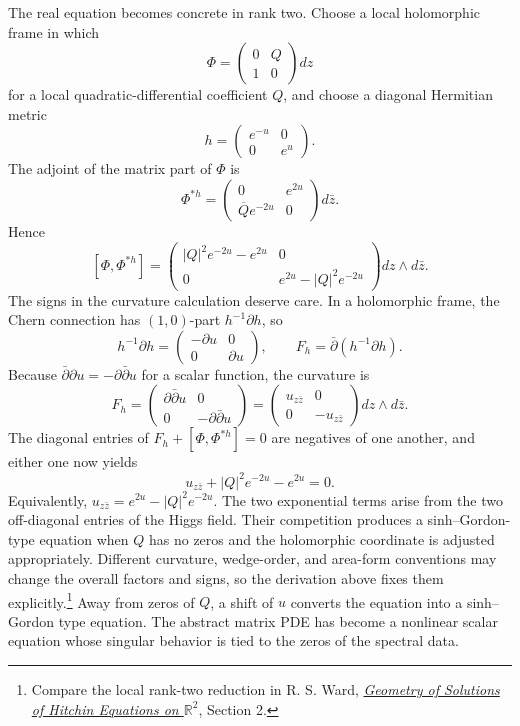 The real equation becomes concrete in rank two.  Choose a local holomorphic frame in which
\[
  \Phi=
  \begin{pmatrix}
    0&Q\\
    1&0
  \end{pmatrix}dz
\]
for a local quadratic-differential coefficient \(Q\), and choose a diagonal Hermitian metric
\[
  h=
  \begin{pmatrix}
    e^{-u}&0\\
    0&e^u
  \end{pmatrix}.
\]
The adjoint of the matrix part of \(\Phi\) is
\[
  \Phi^{*h}
  =
  \begin{pmatrix}
    0&e^{2u}\\
    \overline Q e^{-2u}&0
  \end{pmatrix}d\bar z.
\]
Hence
\[
  [\Phi,\Phi^{*h}]
  =
  \begin{pmatrix}
    |Q|^2e^{-2u}-e^{2u}&0\\
    0&e^{2u}-|Q|^2e^{-2u}
  \end{pmatrix}dz\wedge d\bar z.
\]
The signs in the curvature calculation deserve care. In a holomorphic frame, the Chern connection has $(1,0)$-part $h^{-1}\partial h$, so
\[
 h^{-1}\partial h=
 \begin{pmatrix}-\partial u&0\\0&\partial u\end{pmatrix},
 \qquad
 F_h=\bar\partial(h^{-1}\partial h).
\]
Because $\bar\partial\partial u=-\partial\bar\partial u$ for a scalar function, the curvature is
\[
 F_h=
 \begin{pmatrix}
  \partial\bar\partial u&0\\
  0&-\partial\bar\partial u
 \end{pmatrix}
 =
 \begin{pmatrix}
  u_{z\bar z}&0\\0&-u_{z\bar z}
 \end{pmatrix}dz\wedge d\bar z.
\]
The diagonal entries of $F_h+[\Phi,\Phi^{*h}]=0$ are negatives of one another, and either one now yields
\[
 \boxed{u_{z\bar z}+|Q|^2e^{-2u}-e^{2u}=0.}
\]
Equivalently, $u_{z\bar z}=e^{2u}-|Q|^2e^{-2u}$. The two exponential terms arise from the two off-diagonal entries of the Higgs field. Their competition produces a sinh--Gordon-type equation when $Q$ has no zeros and the holomorphic coordinate is adjusted appropriately. Different curvature, wedge-order, and area-form conventions may change the overall factors and signs, so the derivation above fixes them explicitly.\footnote{Compare the local rank-two reduction in R. S. Ward, \href{https://arxiv.org/abs/1507.07462}{\emph{Geometry of Solutions of Hitchin Equations on $\mathbb R^2$}}, Section 2.}  Away from zeros of \(Q\), a shift of \(u\) converts the equation into a sinh--Gordon type equation.  The abstract matrix PDE has become a nonlinear scalar equation whose singular behavior is tied to the zeros of the spectral data.

